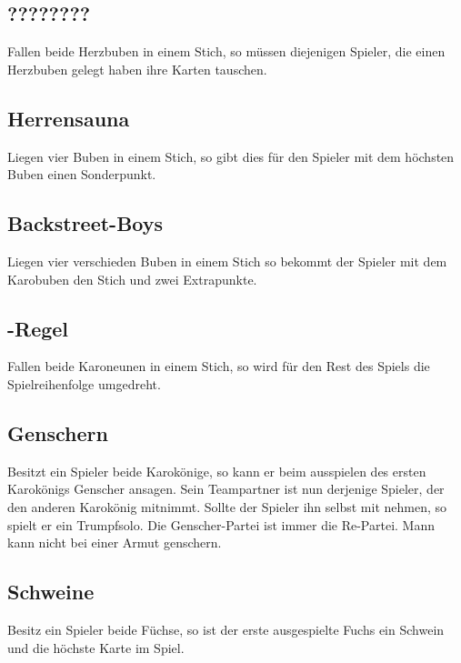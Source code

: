 \documentclass[a4paper,11pt]{article}
\begin{document}
\subsection{????????}Fallen beide Herzbuben in einem Stich, so müssen diejenigen Spieler, die einen Herzbuben gelegt haben ihre Karten tauschen.
\subsection{Herrensauna} Liegen vier Buben in einem Stich, so gibt dies für den Spieler mit dem höchsten Buben einen Sonderpunkt.
\subsection{Backstreet-Boys} Liegen vier verschieden Buben in einem Stich so bekommt der Spieler mit dem Karobuben den Stich und zwei Extrapunkte.
\subsection{\grqq-Regel} Fallen beide Karoneunen in einem Stich, so wird für den Rest des Spiels die Spielreihenfolge umgedreht.
\subsection{Genschern} Besitzt ein Spieler beide Karokönige, so kann er beim ausspielen des ersten Karokönigs Genscher ansagen. Sein Teampartner ist nun derjenige Spieler, der den anderen Karokönig mitnimmt. Sollte der Spieler ihn selbst mit nehmen, so spielt er ein Trumpfsolo. Die Genscher-Partei ist immer die Re-Partei. Mann kann nicht bei einer Armut genschern.
\subsection{Schweine} Besitz ein Spieler beide Füchse, so ist der erste ausgespielte Fuchs ein Schwein und die höchste Karte im Spiel.
\end{document}
